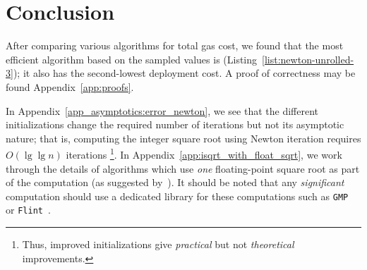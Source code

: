 \section{Conclusion}

After comparing various algorithms for total gas cost,
we found that the most efficient algorithm based on the sampled values is
\UnrolledThree{} (Listing~\ref{list:newton-unrolled-3});
it also has the second-lowest deployment cost.
A proof of correctness may be found Appendix~\ref{app:proofs}.

In Appendix~\ref{app_asymptotics:error_newton},
we see that the different initializations change
the required number of iterations but not its asymptotic nature;
that is, computing the integer square root
using Newton iteration requires $O(\lg \lg n)$ iterations%
\footnote{Thus, improved initializations give \emph{practical}
but not \emph{theoretical} improvements.}.
In Appendix~\ref{app:isqrt_with_float_sqrt},
we work through the details of algorithms which use
\emph{one} floating-point square root as part of the computation
(as suggested by~\cite[Chapter 1.7, Remarks]{cohen1993}).
It should be noted that any \emph{significant} computation
should use a dedicated library for these computations
such as \texttt{GMP}~\cite{gmplib} or \texttt{Flint}~\cite{flint}.
